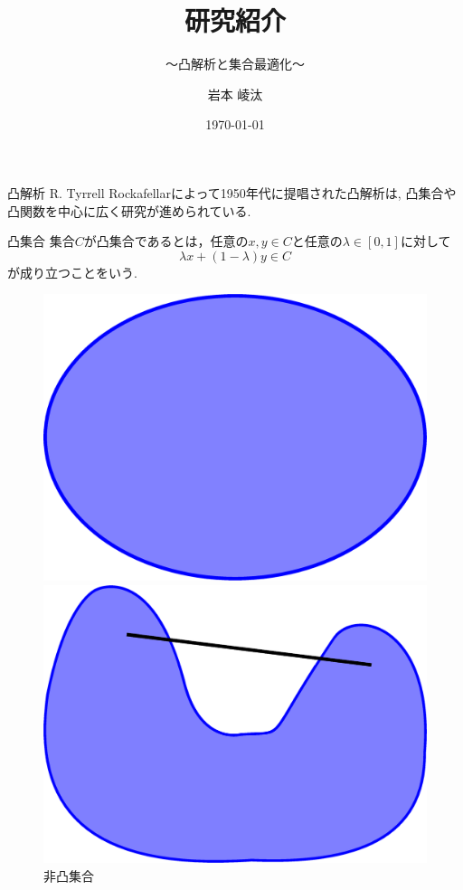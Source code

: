 \documentclass[aspectratio=169, dvipdfmx, 11pt]{beamer} %
\title[研究紹介]{研究紹介}
\subtitle{〜凸解析と集合最適化〜}
\author[岩本 崚汰]{岩本 崚汰}
\institute[新潟大学大学院]{新潟大学大学院 自然科学研究科 数理科学専攻}
\date{\today}
\begin{document}
\maketitle

\begin{frame}{凸解析}
  R. Tyrrell Rockafellarによって1950年代に提唱された凸解析は, 凸集合や凸関数を中心に広く研究が進められている.
  \begin{block}{凸集合}
    集合$C$が凸集合であるとは，任意の$x, y\in C$と任意の$\lambda\in[0, 1]$に対して
    \[
      \lambda x + (1-\lambda)y\in C
    \]
    が成り立つことをいう.
  \end{block}
  \centering
  \begin{figure}
    \begin{minipage}{.45\textwidth}
      \centering
      \includegraphics[keepaspectratio, scale=0.095]{figures/eps/convex_set.eps}
      \caption{凸集合}
    \end{minipage}\hfill
    \begin{minipage}{.45\textwidth}
      \centering
      \includegraphics[keepaspectratio, scale=0.095]{figures/eps/non_convex_set.eps}
      \caption{非凸集合}
    \end{minipage}
  \end{figure}
\end{frame}
\end{document}
